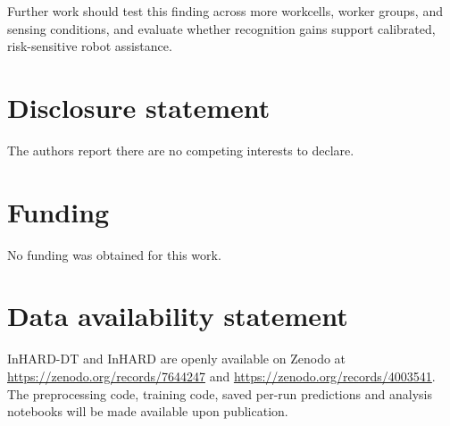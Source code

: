 \documentclass[]{interact}
\begin{document}
Further work
should test this finding across more workcells, worker groups, and sensing
conditions, and evaluate whether recognition gains support calibrated,
risk-sensitive robot assistance.



\section*{Disclosure statement}

The authors report there are no competing interests to declare.

\section*{Funding}

No funding was obtained for this work.



\section*{Data availability statement}

InHARD-DT and InHARD are openly available on Zenodo at
\url{https://zenodo.org/records/7644247} and
\url{https://zenodo.org/records/4003541}. The preprocessing code, training
code, saved per-run predictions and analysis notebooks will be made available
upon publication.



\end{document}
